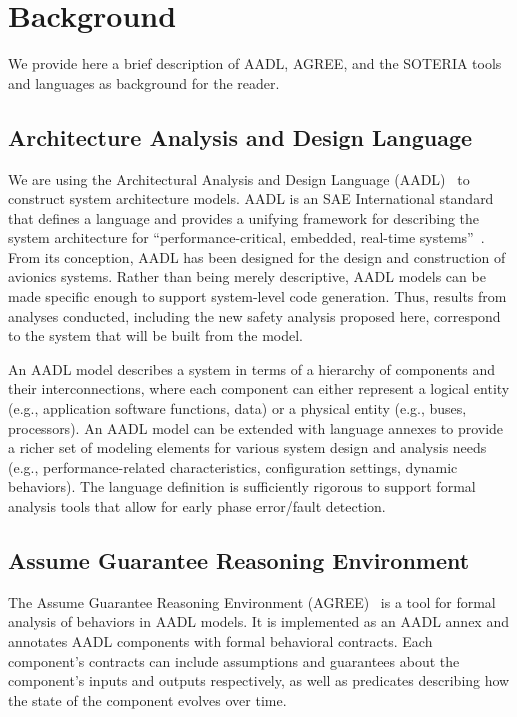 \section{Background}

We provide here a brief description of AADL, AGREE, and the SOTERIA tools and languages as background for the reader.

\subsection{Architecture Analysis and Design Language}
We are using the Architectural Analysis and Design Language (AADL)~\cite{FeilerModelBasedEngineering2012} to construct system architecture models.  AADL is an SAE International standard~\cite{AADL_Standard} that defines a language and provides a unifying framework for describing the system architecture for ``performance-critical, embedded, real-time systems''~\cite{AADL_Standard}. From its conception, AADL has been designed for the design and construction of avionics systems.  Rather than being merely descriptive, AADL models can be made specific enough to support system-level code generation.  Thus, results from analyses conducted, including the new safety analysis proposed here, correspond to the system that will be built from the model.  

An AADL model describes a system in terms of a hierarchy of components and their interconnections, where each component can either represent a logical entity (e.g., application software functions, data) or a physical entity (e.g., buses, processors). An AADL model can be extended with language annexes to provide a richer set of modeling elements for various system design and analysis needs (e.g., performance-related characteristics, configuration settings, dynamic behaviors). The language definition is sufficiently rigorous to support formal analysis tools that allow for early phase error/fault detection.

\subsection{Assume Guarantee Reasoning Environment}
The Assume Guarantee Reasoning Environment (AGREE)~\cite{NFM2012:CoGaMiWhLaLu} is a tool for formal analysis of behaviors in AADL models.  It is implemented as an AADL annex and annotates AADL components with formal behavioral contracts. Each component's contracts can include assumptions and guarantees about the component's inputs and outputs respectively, as well as predicates describing how the state of the component evolves over time.

